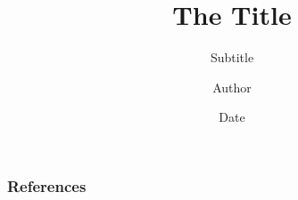 \documentclass[pdf]{beamer}
\begin{document}
\title[Footer Title]{The Title}
\subtitle[]{Subtitle}
\author{Author}
\date{Date}

\begin{frame}
    \titlepage
\end{frame}





\begin{frame}[allowframebreaks]
    \frametitle{References}
    \tiny{ }
    
\end{frame}
\end{document}
